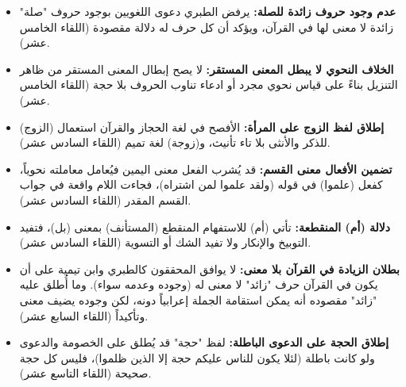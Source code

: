 \begin{itemize}
    \item \textbf{عدم وجود حروف زائدة للصلة:} يرفض الطبري دعوى اللغويين بوجود حروف "صلة" زائدة لا معنى لها في القرآن، ويؤكد أن كل حرف له دلالة مقصودة (اللقاء الخامس عشر).
    \item \textbf{الخلاف النحوي لا يبطل المعنى المستقر:} لا يصح إبطال المعنى المستقر من ظاهر التنزيل بناءً على قياس نحوي مجرد أو ادعاء تناوب الحروف بلا حجة (اللقاء الخامس عشر).
    \item \textbf{إطلاق لفظ الزوج على المرأة:} الأفصح في لغة الحجاز والقرآن استعمال (الزوج) للذكر والأنثى بلا تاء تأنيث، و(زوجة) لغة تميم (اللقاء السادس عشر).
    \item \textbf{تضمين الأفعال معنى القسم:} قد يُشرب الفعل معنى اليمين فيُعامل معاملته نحوياً، كفعل (علموا) في قوله (ولقد علموا لمن اشتراه)، فجاءت اللام واقعة في جواب القسم المقدر (اللقاء السادس عشر).
    \item \textbf{دلالة (أم) المنقطعة:} تأتي (أم) للاستفهام المنقطع (المستأنف) بمعنى (بل)، فتفيد التوبيخ والإنكار ولا تفيد الشك أو التسوية (اللقاء السادس عشر).
    \item \textbf{بطلان الزيادة في القرآن بلا معنى:} لا يوافق المحققون كالطبري وابن تيمية على أن يكون في القرآن حرف "زائد" لا معنى له (وجوده وعدمه سواء). وما أُطلق عليه "زائد" مقصوده أنه يمكن استقامة الجملة إعرابياً دونه، لكن وجوده يضيف معنى وتأكيداً (اللقاء السابع عشر).
    \item \textbf{إطلاق الحجة على الدعوى الباطلة:} لفظ "حجة" قد يُطلق على الخصومة والدعوى ولو كانت باطلة (لئلا يكون للناس عليكم حجة إلا الذين ظلموا)، فليس كل حجة صحيحة (اللقاء التاسع عشر).
\end{itemize}

